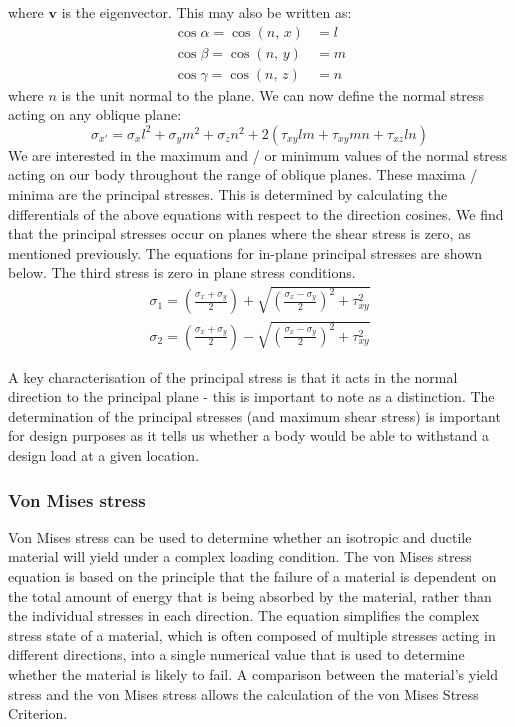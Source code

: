where $\boldsymbol{v}$ is the eigenvector. This may also be written as:
\begin{align}
    \cos \alpha = \cos\left(n, \, x\right) & = l \\
    \cos \beta = \cos\left(n, \, y\right)  & = m \\
    \cos \gamma = \cos\left(n, \, z\right) & = n
\end{align}
where $n$ is the unit normal to the plane. We can now define the normal stress acting on any oblique plane:
\begin{equation}
    \sigma_{x'} = \sigma_xl^2 + \sigma_y m^2 +\sigma_zn^2 + 2\left(\tau_{xy}lm + \tau_{xy}mn + \tau_{xz}ln\right)
\end{equation}
We are interested in the maximum and / or minimum values of the normal stress acting on our body throughout the range of oblique planes. These maxima / minima are the principal stresses. This is determined by calculating the differentials of the above equations with respect to the direction cosines. We find that the principal stresses occur on planes where the shear stress is zero, as mentioned previously. The equations for in-plane principal stresses are shown below. The third stress is zero in plane stress conditions.
\begin{gather}
    \sigma_1 = \left(\frac{\sigma_x + \sigma_y}{2}\right)+ \sqrt{\left(\frac{\sigma_x - \sigma_y}{2} \right)^2+ \tau^2_{xy} }\\
    \sigma_2 = \left(\frac{\sigma_x + \sigma_y}{2}\right)- \sqrt{\left(\frac{\sigma_x - \sigma_y}{2} \right)^2+ \tau^2_{xy} }
\end{gather}

A key characterisation of the principal stress is that it acts in the normal direction to the principal plane - this is important to note as a distinction. The determination of the principal stresses (and maximum shear stress) is important for design purposes as it tells us whether a body would be able to withstand a design load at a given location.
\subsubsection{Von Mises stress}
Von Mises stress can be used to determine whether an isotropic and ductile material will yield under a complex loading condition. The von Mises stress equation is based on the principle that the failure of a material is dependent on the total amount of energy that is being absorbed by the material, rather than the individual stresses in each direction. The equation simplifies the complex stress state of a material, which is often composed of multiple stresses acting in different directions, into a single numerical value that is used to determine whether the material is likely to fail. A comparison between the material's yield stress and the von Mises stress allows the calculation of the von Mises Stress Criterion.

